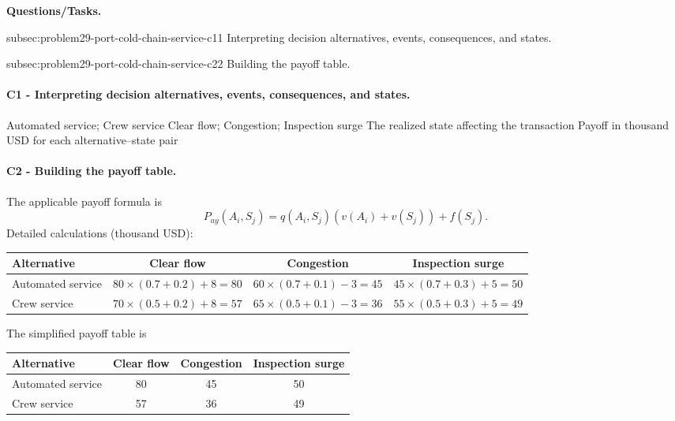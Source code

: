 	\textbf{Questions/Tasks.}
	\begin{enumerate}
	\CriterionTask
	{subsec:problem29-port-cold-chain-service-c1}{1}
	{Interpreting decision alternatives, events, consequences, and states.}

	\CriterionTask
	{subsec:problem29-port-cold-chain-service-c2}{2}
	{Building the payoff table.}
	\end{enumerate}

	\paragraph*{C1 - Interpreting decision alternatives, events, consequences, and states.}
	\label{subsec:problem29-port-cold-chain-service-c1}
	\DecisionElementsTable
	{Automated service; Crew service}
	{Clear flow; Congestion; Inspection surge}
	{The realized state affecting the transaction}
	{Payoff in thousand USD for each alternative--state pair}

	\paragraph*{C2 - Building the payoff table.}
	\label{subsec:problem29-port-cold-chain-service-c2}
	The applicable payoff formula is
	\[ P_{ay}(A_i,S_j)=q(A_i,S_j)\left(v(A_i)+v(S_j)\right)+f(S_j). \]
	Detailed calculations (thousand USD):
	\begin{center}\small
	\begin{tabular}{lccc}
	\toprule
	Alternative & Clear flow & Congestion & Inspection surge \\
	\midrule
	Automated service & $80\times(0.7+0.2)+8=80$ & $60\times(0.7+0.1)-3=45$ & $45\times(0.7+0.3)+5=50$ \\
Crew service & $70\times(0.5+0.2)+8=57$ & $65\times(0.5+0.1)-3=36$ & $55\times(0.5+0.3)+5=49$ \\
	\bottomrule
	\end{tabular}
	\end{center}
	The simplified payoff table is
	\begin{center}
	\begin{tabular}{lccc}
	\toprule
	Alternative & Clear flow & Congestion & Inspection surge \\
	\midrule
	Automated service & 80 & 45 & 50 \\
Crew service & 57 & 36 & 49 \\
	\bottomrule
	\end{tabular}
	\end{center}

